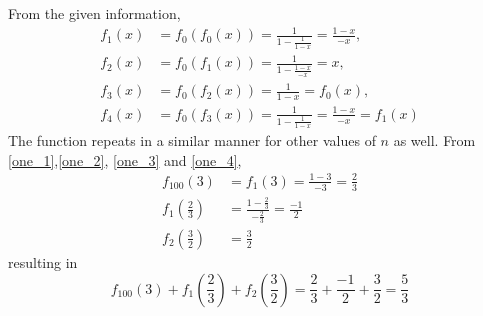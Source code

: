 From the given information, 
\begin{align}
\label{one_1}
f_{1}(x)&=f_{0}(f_{0}(x))=\frac{1}{1-\frac{1}{1-x}}=\frac{1-x}{-x}, \\
\label{one_2}
f_{2}(x)&=f_{0}(f_{1}(x))=\frac{1}{1-\frac{1-x}{-x}}=x, \\
\label{one_3}
f_{3}(x)&=f_{0}(f_{2}(x))=\frac{1}{1-x}=f_{0}(x), \\
\label{one_4}
f_{4}(x)&=f_{0}(f_{3}(x))=\frac{1}{1-\frac{1}{1-x}}=\frac{1-x}{-x}=f_{1}(x)
\end{align}
The function repeats in a similar manner for other values of $n$ as well.
From \eqref{one_1},\eqref{one_2}, \eqref{one_3} and \eqref{one_4},
\begin{align}
  f_{100}(3)&=f_{1}(3)=\frac{1-3}{-3}=\frac{2}{3}\\
  f_{1}\left(\frac{2}{3}\right)&=\frac{1-\frac{2}{3}}{-\frac{2}{3}}=\frac{-1}{2}\\
  f_{2}\left(\frac{3}{2}\right)&=\frac{3}{2}
\end{align}
resulting in
%
\begin{equation}
f_{100}(3) + f_{1}\left(\frac{2}{3}\right) + f_{2}\left(\frac{3}{2}\right)=\frac{2}{3} + \frac{-1}{2} + \frac{3}{2}=\frac{5}{3}	
\end{equation}
%
